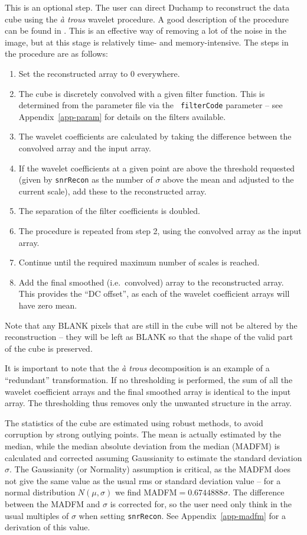 \documentclass[12pt,a4paper]{article}
\newcommand{\ie}{i.e.\ }
\begin{document}
This is an optional step. The user can direct Duchamp to
reconstruct the data cube using the {\it {\`a} trous} wavelet
procedure. A good description of the procedure can be found in
\citet{starck02:book}. This is an effective way of removing a
lot of the noise in the image, but at this stage is relatively time-
and memory-intensive. The steps in the procedure are as follows:
\begin{enumerate}
\item Set the reconstructed array to 0 everywhere.
\item The cube is discretely convolved with a given filter
  function. This is determined from the parameter file via the {\tt
  filterCode} parameter -- see Appendix~\ref{app-param} for details on
  the filters available.
\item The wavelet coefficients are calculated by taking the difference
  between the convolved array and the input array.
\item If the wavelet coefficients at a given point are above the
  threshold requested (given by {\tt snrRecon} as the number of
  $\sigma$ above the mean and adjusted to the current scale), add
  these to the reconstructed array.
\item The separation of the filter coefficients is doubled.
\item The procedure is repeated from step 2, using the convolved array
  as the input array.
\item Continue until the required maximum number of scales is reached.
\item Add the final smoothed (\ie convolved) array to the
  reconstructed array. This provides the ``DC offset'', as each of the
  wavelet coefficient arrays will have zero mean.
\end{enumerate}

Note that any BLANK pixels that are still in the cube will not be
altered by the reconstruction -- they will be left as BLANK so that
the shape of the valid part of the cube is preserved.

It is important to note that the {\it {\`a} trous} decomposition is
an example of a ``redundant'' transformation. If no thresholding is
performed, the sum of all the wavelet coefficient arrays and the final
smoothed array is identical to the input array. The thresholding thus
removes only the unwanted structure in the array. 

The statistics of the cube are estimated using robust methods, to
avoid corruption by strong outlying points. The mean is actually
estimated by the median, while the median absolute deviation from the
median (MADFM) is calculated and corrected assuming Gaussianity to
estimate the standard deviation $\sigma$. The Gaussianity (or
Normality) assumption is critical, as the MADFM does not give the same
value as the usual rms or standard deviation value -- for a normal
distribution $N(\mu,\sigma)$ we find MADFM$=0.6744888\sigma$. The
difference between the MADFM and $\sigma$ is corrected for, so the
user need only think in the usual multiples of $\sigma$ when setting
{\tt snrRecon}. See Appendix~\ref{app-madfm} for a derivation of this
value.
\end{document}
